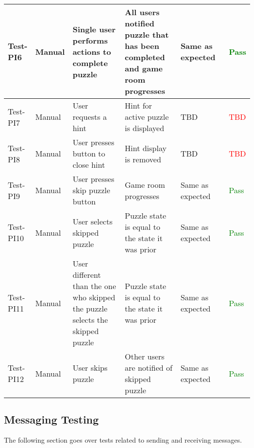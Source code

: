 \documentclass[12pt, titlepage]{article}
\begin{document}
\begin{table}[H]
{\begin{tabular}{|l|p{0.15\linewidth}|p{0.3\linewidth}|p{0.3\linewidth}|p{0.3\linewidth}|p{0.1\linewidth}|}
\hline
Test-PI6 & Manual & Single user performs actions to complete puzzle & All users notified puzzle that has been completed and game room progresses & Same as expected & \textcolor{Green}{Pass} \\
\hline
Test-PI7 & Manual & User requests a hint & Hint for active puzzle is displayed & TBD & \textcolor{Red}{TBD} \\
\hline
Test-PI8 & Manual & User presses button to close hint & Hint display is removed & TBD & \textcolor{Red}{TBD} \\
\hline
Test-PI9 & Manual & User presses skip puzzle button & Game room progresses & Same as expected & \textcolor{Green}{Pass} \\
\hline
Test-PI10 & Manual & User selects skipped puzzle & Puzzle state is equal to the state it was prior & Same as expected & \textcolor{Green}{Pass} \\
\hline
Test-PI11 & Manual & User different than the one who skipped the puzzle selects the skipped puzzle & Puzzle state is equal to the state it was prior & Same as expected & \textcolor{Green}{Pass} \\
\hline
Test-PI12 & Manual & User skips puzzle & Other users are notified of skipped puzzle & Same as expected & \textcolor{Green}{Pass} \\
\hline
\end{tabular}}
\label{table:PI1}
\end{table}

\subsection{Messaging Testing}
The following section goes over tests related to sending and receiving messages. 
\end{document}
